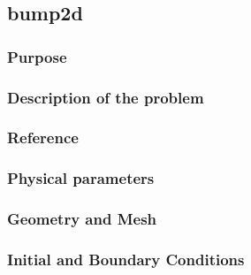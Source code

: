 \subsection{bump2d}
%

%    
\subsubsection{Purpose}
%

%
\subsubsection{Description of the problem}
%

%    
%
\subsubsection{Reference}
%

%
%
\subsubsection{Physical parameters}
%

%
%
\subsubsection{Geometry and Mesh}
%

%
%
\subsubsection{Initial and Boundary Conditions}
%

%
%
